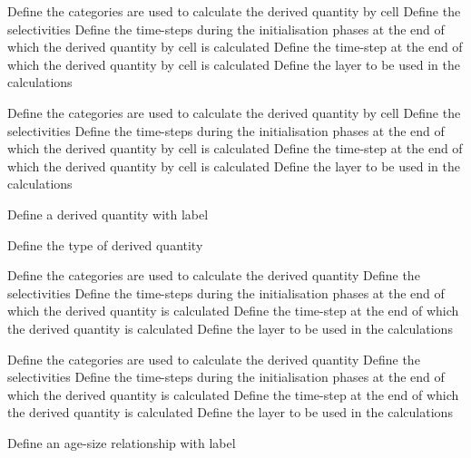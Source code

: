  {Define the categories are used to calculate the derived quantity by cell}
 {Define the selectivities}
 {Define the time-steps during the initialisation phases at the end of which the derived quantity by cell is calculated}
 {Define the time-step at the end of which the derived quantity by cell is calculated}
 {Define the layer to be used in the calculations}
\par\textbf{}\par
{} {Define the categories are used to calculate the derived quantity by cell}
 {Define the selectivities}
 {Define the time-steps during the initialisation phases at the end of which the derived quantity by cell is calculated}
 {Define the time-step at the end of which the derived quantity by cell is calculated}
 {Define the layer to be used in the calculations}
\par{} {Define a derived quantity with label}\par
{} {Define the type of derived quantity}
\par\textbf{}\par
{} {Define the categories are used to calculate the derived quantity}
 {Define the selectivities}
 {Define the time-steps during the initialisation phases at the end of which the derived quantity is calculated}
 {Define the time-step at the end of which the derived quantity is calculated}
 {Define the layer to be used in the calculations}
\par\textbf{}\par
{} {Define the categories are used to calculate the derived quantity}
 {Define the selectivities}
 {Define the time-steps during the initialisation phases at the end of which the derived quantity is calculated}
 {Define the time-step at the end of which the derived quantity is calculated}
 {Define the layer to be used in the calculations}
\par{} {Define an age-size relationship with label}\par
